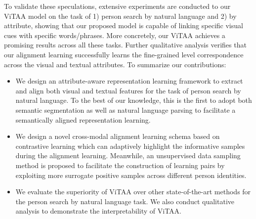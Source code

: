 \documentclass[runningheads]{llncs}
\begin{document}
To validate these speculations, extensive experiments are conducted to our ViTAA model on the task of 1) person search by natural language and 2) by attribute, showing that our proposed model is capable of linking specific visual cues with specific words/phrases. More concretely, our ViTAA achieves a promising results across all these tasks. Further qualitative analysis verifies that our alignment learning successfully learns the fine-grained level correspondence across the visual and textual attributes. To summarize our contributions:
\begin{itemize}
\item We design an attribute-aware representation learning framework to extract and align both visual and textual features for the task of person search by natural language. To the best of our knowledge, this is the first to adopt both semantic segmentation as well as natural language parsing to facilitate a semantically aligned representation learning.

\item We design a novel cross-modal alignment learning schema based on contrastive learning which can adaptively highlight the informative samples during the alignment learning. Meanwhile, an unsupervised data sampling method is proposed to facilitate the construction of learning pairs by exploiting more surrogate positive samples across different person identities.

\item We evaluate the superiority of ViTAA over other state-of-the-art methods for the person search by natural language task. We also conduct qualitative analysis to demonstrate the interpretability of ViTAA.
\end{itemize}
\end{document}
